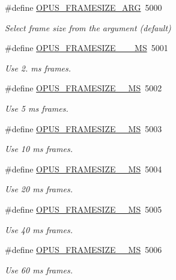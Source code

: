 \begin{DoxyCompactItemize}
\#define \hyperlink{group__opus__ctlvalues_ga0371f264203138ca92a3705c9c0ac39d}{O\+P\+U\+S\+\_\+\+F\+R\+A\+M\+E\+S\+I\+Z\+E\+\_\+\+A\+RG}~5000
\begin{DoxyCompactList}\small\item\em Select frame size from the argument (default) \end{DoxyCompactList}\item 
\#define \hyperlink{group__opus__ctlvalues_ga4696f62216f4afb1493471bb4c25baea}{O\+P\+U\+S\+\_\+\+F\+R\+A\+M\+E\+S\+I\+Z\+E\+\_\+\_\+\_\+\+MS}~5001
\begin{DoxyCompactList}\small\item\em Use 2. ms frames. \end{DoxyCompactList}\item 
\#define \hyperlink{group__opus__ctlvalues_gab2e88add9d69a0828ca23efc7bbb41be}{O\+P\+U\+S\+\_\+\+F\+R\+A\+M\+E\+S\+I\+Z\+E\+\_\+\_\+\+MS}~5002
\begin{DoxyCompactList}\small\item\em Use 5 ms frames. \end{DoxyCompactList}\item 
\#define \hyperlink{group__opus__ctlvalues_ga39d5606c61c4cd21e6ae2f1259a1f15f}{O\+P\+U\+S\+\_\+\+F\+R\+A\+M\+E\+S\+I\+Z\+E\+\_\+\_\+\+MS}~5003
\begin{DoxyCompactList}\small\item\em Use 10 ms frames. \end{DoxyCompactList}\item 
\#define \hyperlink{group__opus__ctlvalues_gacfce47959bdaa8581fdc68cec3be2bfb}{O\+P\+U\+S\+\_\+\+F\+R\+A\+M\+E\+S\+I\+Z\+E\+\_\+\_\+\+MS}~5004
\begin{DoxyCompactList}\small\item\em Use 20 ms frames. \end{DoxyCompactList}\item 
\#define \hyperlink{group__opus__ctlvalues_ga268935a23f6d8a8ae6bb3d11ac6ae172}{O\+P\+U\+S\+\_\+\+F\+R\+A\+M\+E\+S\+I\+Z\+E\+\_\+\_\+\+MS}~5005
\begin{DoxyCompactList}\small\item\em Use 40 ms frames. \end{DoxyCompactList}\item 
\#define \hyperlink{group__opus__ctlvalues_gac8178be7f02dc908c022cc3bb5c6c252}{O\+P\+U\+S\+\_\+\+F\+R\+A\+M\+E\+S\+I\+Z\+E\+\_\+\_\+\+MS}~5006
\begin{DoxyCompactList}\small\item\em Use 60 ms frames. \end{DoxyCompactList}\item 

\end{DoxyCompactItemize}
